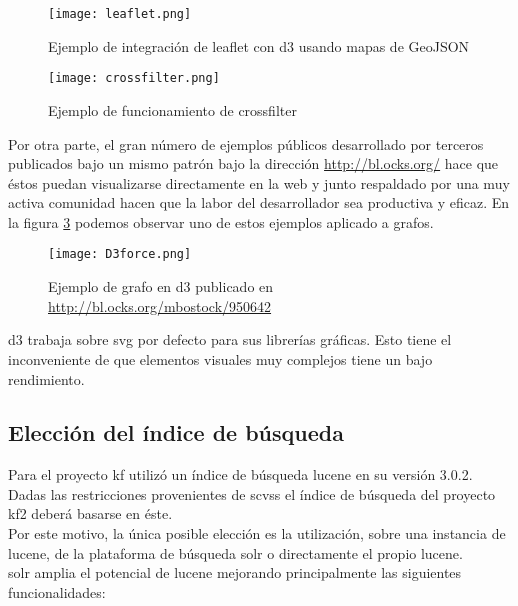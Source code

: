 \begin{figure}[h!]
  \centering
    \texttt{[image: leaflet.png]}
  \caption{Ejemplo de integración de \gls{leaflet} con \gls{d3} usando mapas de GeoJSON \cite{d3leaflet}}
  \label{image:leaflet}
\end{figure}


\begin{figure}[h!]
  \centering
    \texttt{[image: crossfilter.png]}
  \caption{Ejemplo de funcionamiento de \gls{crossfilter} \cite{crossfilter}}
  \label{image:crossfilter}
\end{figure}


Por otra parte, el gran número de ejemplos públicos desarrollado por terceros publicados bajo un mismo patrón bajo la dirección \url{http://bl.ocks.org/} hace que éstos puedan visualizarse directamente en la web y junto respaldado por una muy activa comunidad hacen que la labor del desarrollador sea productiva y eficaz. En la figura \ref{image:D3force} podemos observar uno de estos ejemplos aplicado a grafos.

\begin{figure}[h!]
  \centering
    \texttt{[image: D3force.png]}
  \caption{Ejemplo de grafo en \gls{d3} publicado en \url{http://bl.ocks.org/mbostock/950642}}
  \label{image:D3force}
\end{figure}

\Gls{d3} trabaja sobre \gls{svg} por defecto para sus librerías gráficas. Esto tiene el inconveniente de que elementos visuales muy complejos tiene un bajo rendimiento.

\subsection{Elección del índice de búsqueda}
Para el proyecto \gls{kf} utilizó un índice de búsqueda \gls{lucene} en su versión 3.0.2. Dadas las restricciones provenientes de \gls{scvss} el índice de búsqueda del proyecto \gls{kf2} deberá basarse en éste.\\

Por este motivo, la única posible elección es la utilización, sobre una instancia de \gls{lucene}, de la plataforma de búsqueda \gls{solr} o directamente el propio \gls{lucene}.\\ 

\Gls{solr} amplia el potencial de \gls{lucene} mejorando principalmente las siguientes funcionalidades:

